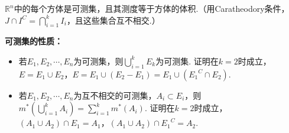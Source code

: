 \documentclass[bwprint, withoutpreface]{cumcmthesis}
\begin{document}
$\mathbb{R}^n$中的每个方体是可测集，且其测度等于方体的体积.（用Caratheodory条件，$J \cap {I^C} = \bigcap_{i = 1}^{k}{I_i}$，且这些集合互不相交.）

\textbf{可测集的性质：}
\begin{itemize}[itemindent=2em]
	\item 若$E_1, E_2, \cdots, E_n$为可测集，则$\bigcup_{i = 1}^{k}{E_k}$为可测集.
	证明在$k = 2$时成立，$E = E_1 \cup E_2$，$E = E_1 \cup (E_2 - E_1) = E_1 \cup ({E_1}^C \cap E_2)$.
	\item 若$E_1, E_2, \cdots, E_n$为互不相交的可测集，$A_i \subset E_i$，则$m^*(\bigcup_{i = 1}^{k}{A_i}) = \sum_{i = 1}^{k}{m^*(A_i)}$.
	证明在$k = 2$时成立，$(A_1 \cup A_2) \cap E_1 = A_1$，$(A_1 \cup A_2) \cap {E_1}^C = A_2$.
\end{itemize}

\begin{center}
\end{center}
\end{document}
